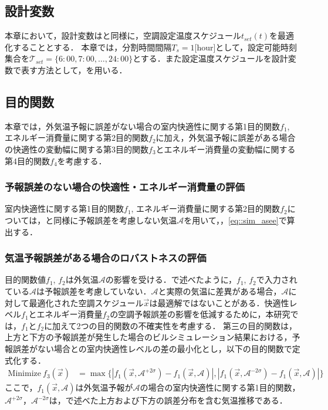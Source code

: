 \subsection{設計変数}
本章において，設計変数はと同様に，空調設定温度スケジュール$t_{set}(t)$を最適化することとする． 本章では，分割時間間隔$T_s=1$[hour]として，設定可能時刻集合を$\mathcal{T}_{set}=\{6:00, 7:00,\dots, 24:00\}$とする．また設定温度スケジュールを設計変数で表す方法として，を用いる．

\subsection{目的関数}\label{sec::robust_objectives}
本章では，外気温予報に誤差がない場合の室内快適性に関する第1目的関数$f_1$, エネルギー消費量に関する第2目的関数$f_2$に加え，外気温予報に誤差がある場合の快適性の変動幅に関する第3目的関数$f_3$とエネルギー消費量の変動幅に関する第4目的関数$f_4$を考慮する．
\subsubsection{予報誤差のない場合の快適性・エネルギー消費量の評価}
室内快適性に関する第1目的関数$f_1$, エネルギー消費量に関する第2目的関数$f_2$については，と同様に予報誤差を考慮しない気温$\mathcal{A}$を用いて，，\eqref{eq::sim_asee}で算出する．

\subsubsection{気温予報誤差がある場合のロバストネスの評価}
目的関数値$f_1$, $f_2$は外気温$\mathcal{A}$の影響を受ける．で述べたように，$f_1$, $f_2$で入力されている$\mathcal{A}$は予報誤差を考慮していない．$\mathcal{A}$と実際の気温に差異がある場合，$\mathcal{A}$に対して最適化された空調スケジュール$\vec{x}$は最適解ではないことがある．快適性レベル$f_1$とエネルギー消費量$f_2$の空調予報誤差の影響を低減するために，本研究では，$f_1$と$f_2$に加えて2つの目的関数の不確実性を考慮する．
第三の目的関数は，上方と下方の予報誤差が発生した場合のビルシミュレーション結果における，予報誤差がない場合との室内快適性レベルの差の最小化とし，以下の目的関数で定式化する．
\begin{align}
    \text{Minimize}~f_3(\vec{x}) & = \max \{|f_1(\vec{x}, \mathcal{A}^{+2\sigma})-f_1(\vec{x}, \mathcal{A})|, |f_1(\vec{x}, \mathcal{A}^{-2\sigma})-f_1(\vec{x}, \mathcal{A})|\}
    \label{eq::robust_objective3}
\end{align}
ここで，$f_1(\vec{x}, \mathcal{A})$は外気温予報が$\mathcal{A}$の場合の室内快適性に関する第1目的関数，$\mathcal{A}^{+2\sigma}$，$\mathcal{A}^{-2\sigma}$は，で述べた上方および下方の誤差分布を含む気温推移である．

